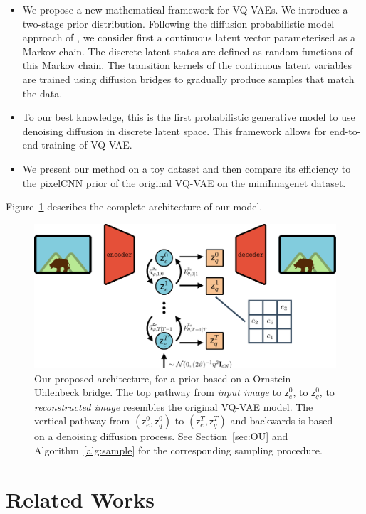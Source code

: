 \documentclass[nohyperref]{article}
\theoremstyle{plain}
\theoremstyle{definition}
\theoremstyle{remark}
\newcommand{\latentcont}{\mathsf{z}_e}
\newcommand{\latentdis}{\mathsf{z}_q}
\begin{document}
\begin{itemize}
    \item We propose a new mathematical framework for VQ-VAEs. We introduce a two-stage prior distribution. Following the diffusion probabilistic model approach of \cite{ho2020denoising}, we consider first a continuous latent vector parameterised as a Markov chain. The discrete latent states are defined  as random functions of this Markov chain. The  transition kernels of the continuous latent variables are trained using diffusion bridges to gradually produce samples that match the data.
    \item  To our best knowledge, this is the first probabilistic generative model to use denoising diffusion in discrete latent space. This framework allows for end-to-end training of VQ-VAE.
    \item We present our method on a toy dataset and then compare its efficiency to the pixelCNN prior of the original VQ-VAE on the miniImagenet dataset.
\end{itemize}
Figure~\ref{fig:archi} describes the complete architecture of our model.
\begin{figure}[h]
    \centering
    \includegraphics[width=\linewidth]{images/Archi.png}
    \caption{Our proposed architecture, for a prior based on a Ornstein-Uhlenbeck bridge. The top pathway from \textit{input image} to $\latentcont^0$, to $\latentdis^0$, to \textit{reconstructed image} resembles the original VQ-VAE model. The vertical pathway from $(\latentcont^0, \latentdis^0)$ to $(\latentcont^T, \latentdis^T)$ and backwards is based on a denoising diffusion process. See Section~\ref{sec:OU} and Algorithm~\ref{alg:sample} for the corresponding sampling procedure.}
    \label{fig:archi}
\end{figure}
\section{Related Works}
\end{document}
